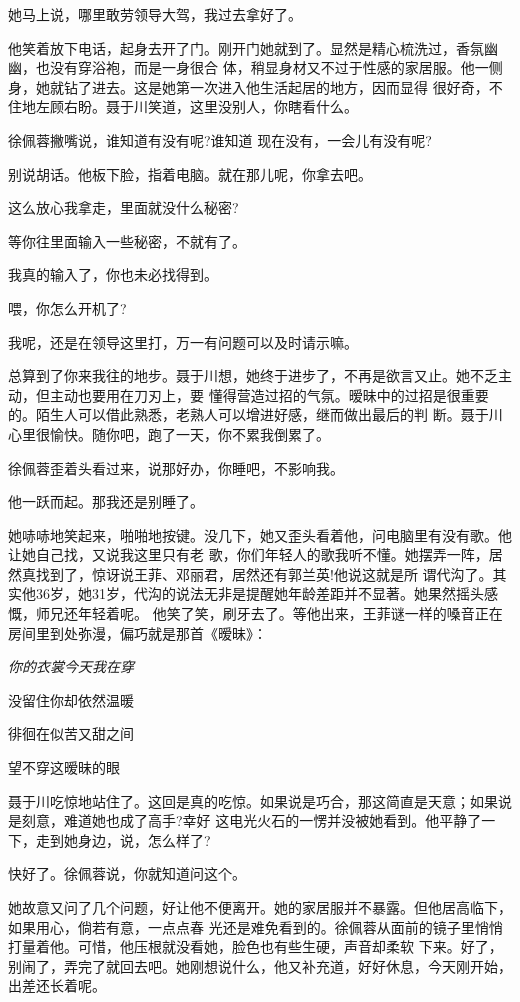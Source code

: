 \documentclass[11pt,a4paper,onecolumn]{article}
\begin{document}
她马上说，哪里敢劳领导大驾，我过去拿好了。

他笑着放下电话，起身去开了门。刚开门她就到了。显然是精心梳洗过，香氛幽幽，也没有穿浴袍，而是一身很合
体，稍显身材又不过于性感的家居服。他一侧身，她就钻了进去。这是她第一次进入他生活起居的地方，因而显得
很好奇，不住地左顾右盼。聂于川笑道，这里没别人，你瞎看什么。

徐佩蓉撇嘴说，谁知道有没有呢?谁知道 现在没有，一会儿有没有呢?

别说胡话。他板下脸，指着电脑。就在那儿呢，你拿去吧。

这么放心我拿走，里面就没什么秘密?

等你往里面输入一些秘密，不就有了。

我真的输入了，你也未必找得到。

喂，你怎么开机了?

我呢，还是在领导这里打，万一有问题可以及时请示嘛。

总算到了你来我往的地步。聂于川想，她终于进步了，不再是欲言又止。她不乏主动，但主动也要用在刀刃上，要
懂得营造过招的气氛。暧昧中的过招是很重要的。陌生人可以借此熟悉，老熟人可以增进好感，继而做出最后的判
断。聂于川心里很愉快。随你吧，跑了一天，你不累我倒累了。

徐佩蓉歪着头看过来，说那好办，你睡吧，不影响我。

他一跃而起。那我还是别睡了。

她哧哧地笑起来，啪啪地按键。没几下，她又歪头看着他，问电脑里有没有歌。他让她自己找，又说我这里只有老
歌，你们年轻人的歌我听不懂。她摆弄一阵，居然真找到了，惊讶说王菲、邓丽君，居然还有郭兰英!他说这就是所
谓代沟了。其实他36岁，她31岁，代沟的说法无非是提醒她年龄差距并不显著。她果然摇头感慨，师兄还年轻着呢。
他笑了笑，刷牙去了。等他出来，王菲谜一样的嗓音正在房间里到处弥漫，偏巧就是那首《暧昧》：

\begin{center}
{\itshape 你的衣裳今天我在穿

没留住你却依然温暖

徘徊在似苦又甜之间

望不穿这暧昧的眼
}
\end{center}

聂于川吃惊地站住了。这回是真的吃惊。如果说是巧合，那这简直是天意；如果说是刻意，难道她也成了高手?幸好
这电光火石的一愣并没被她看到。他平静了一下，走到她身边，说，怎么样了?

快好了。徐佩蓉说，你就知道问这个。

她故意又问了几个问题，好让他不便离开。她的家居服并不暴露。但他居高临下，如果用心，倘若有意，一点点春
光还是难免看到的。徐佩蓉从面前的镜子里悄悄打量着他。可惜，他压根就没看她，脸色也有些生硬，声音却柔软
下来。好了，别闹了，弄完了就回去吧。她刚想说什么，他又补充道，好好休息，今天刚开始，出差还长着呢。
\end{document}
